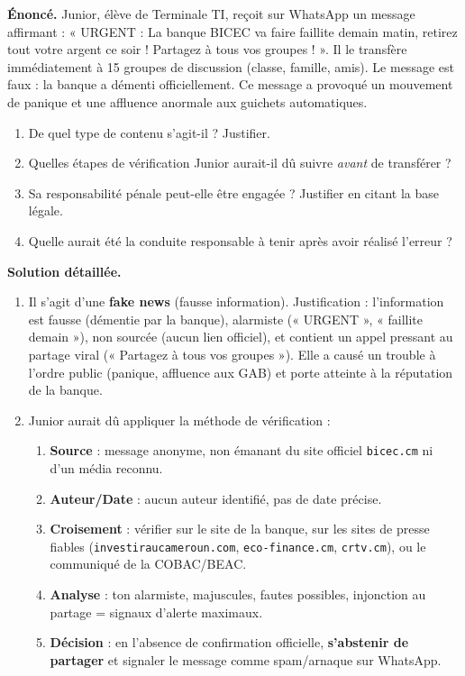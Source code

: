 \documentclass[11pt]{article}
\begin{document}
\begin{exoresolu}
\textbf{Énoncé.} Junior, élève de Terminale TI, reçoit sur WhatsApp un message affirmant : « URGENT : La banque BICEC va faire faillite demain matin, retirez tout votre argent ce soir ! Partagez à tous vos groupes ! ». Il le transfère immédiatement à 15 groupes de discussion (classe, famille, amis). Le message est faux : la banque a démenti officiellement. Ce message a provoqué un mouvement de panique et une affluence anormale aux guichets automatiques.
\begin{enumerate}
\item De quel type de contenu s'agit-il ? Justifier.
\item Quelles étapes de vérification Junior aurait-il dû suivre \emph{avant} de transférer ?
\item Sa responsabilité pénale peut-elle être engagée ? Justifier en citant la base légale.
\item Quelle aurait été la conduite responsable à tenir après avoir réalisé l'erreur ?
\end{enumerate}
\tcblower
\textbf{Solution détaillée.}
\begin{enumerate}
\item Il s'agit d'une \textbf{fake news} (fausse information). Justification : l'information est fausse (démentie par la banque), alarmiste (« URGENT », « faillite demain »), non sourcée (aucun lien officiel), et contient un appel pressant au partage viral (« Partagez à tous vos groupes »). Elle a causé un trouble à l'ordre public (panique, affluence aux GAB) et porte atteinte à la réputation de la banque.
\item Junior aurait dû appliquer la méthode de vérification :
      \begin{enumerate}
      \item \textbf{Source} : message anonyme, non émanant du site officiel \texttt{bicec.cm} ni d'un média reconnu.
      \item \textbf{Auteur/Date} : aucun auteur identifié, pas de date précise.
      \item \textbf{Croisement} : vérifier sur le site de la banque, sur les sites de presse fiables (\texttt{investiraucameroun.com}, \texttt{eco-finance.cm}, \texttt{crtv.cm}), ou le communiqué de la COBAC/BEAC.
      \item \textbf{Analyse} : ton alarmiste, majuscules, fautes possibles, injonction au partage = signaux d'alerte maximaux.
      \item \textbf{Décision} : en l'absence de confirmation officielle, \textbf{s'abstenir de partager} et signaler le message comme spam/arnaque sur WhatsApp.

\end{enumerate}
\end{enumerate}
\end{exoresolu}
\end{document}
